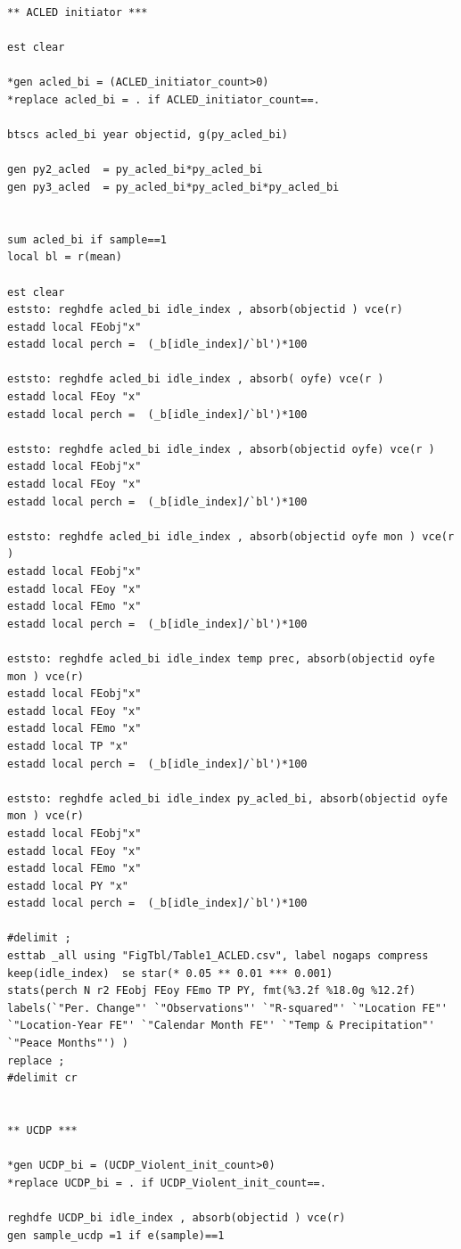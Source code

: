 \documentclass[12pt,letterpaper]{article}
\begin{document}
\begin{lstlisting}
** ACLED initiator ***

est clear 

*gen acled_bi = (ACLED_initiator_count>0)
*replace acled_bi = . if ACLED_initiator_count==.

btscs acled_bi year objectid, g(py_acled_bi)

gen py2_acled  = py_acled_bi*py_acled_bi
gen py3_acled  = py_acled_bi*py_acled_bi*py_acled_bi


sum acled_bi if sample==1 
local bl = r(mean) 

est clear
eststo: reghdfe acled_bi idle_index , absorb(objectid ) vce(r)  
estadd local FEobj"x"
estadd local perch =  (_b[idle_index]/`bl')*100

eststo: reghdfe acled_bi idle_index , absorb( oyfe) vce(r )  
estadd local FEoy "x"
estadd local perch =  (_b[idle_index]/`bl')*100

eststo: reghdfe acled_bi idle_index , absorb(objectid oyfe) vce(r )  
estadd local FEobj"x"
estadd local FEoy "x"
estadd local perch =  (_b[idle_index]/`bl')*100

eststo: reghdfe acled_bi idle_index , absorb(objectid oyfe mon ) vce(r )  
estadd local FEobj"x"
estadd local FEoy "x"
estadd local FEmo "x"
estadd local perch =  (_b[idle_index]/`bl')*100

eststo: reghdfe acled_bi idle_index temp prec, absorb(objectid oyfe mon ) vce(r)  
estadd local FEobj"x"
estadd local FEoy "x"
estadd local FEmo "x"
estadd local TP "x"
estadd local perch =  (_b[idle_index]/`bl')*100

eststo: reghdfe acled_bi idle_index py_acled_bi, absorb(objectid oyfe mon ) vce(r)  
estadd local FEobj"x"
estadd local FEoy "x"
estadd local FEmo "x"
estadd local PY "x"
estadd local perch =  (_b[idle_index]/`bl')*100

#delimit ; 
esttab _all using "FigTbl/Table1_ACLED.csv", label nogaps compress 
keep(idle_index)  se star(* 0.05 ** 0.01 *** 0.001) 
stats(perch N r2 FEobj FEoy FEmo TP PY, fmt(%3.2f %18.0g %12.2f) labels(`"Per. Change"' `"Observations"' `"R-squared"' `"Location FE"' `"Location-Year FE"' `"Calendar Month FE"' `"Temp & Precipitation"' `"Peace Months"') )
replace ; 
#delimit cr 


** UCDP ***

*gen UCDP_bi = (UCDP_Violent_init_count>0)
*replace UCDP_bi = . if UCDP_Violent_init_count==.

reghdfe UCDP_bi idle_index , absorb(objectid ) vce(r)  
gen sample_ucdp =1 if e(sample)==1


\end{lstlisting}
\end{document}
